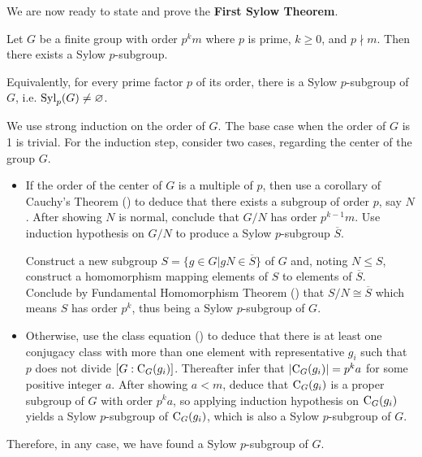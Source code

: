 We are now ready to state and prove the \textbf{First Sylow Theorem}.
\begin{theorem}[Sylow I]\label{thrm-sylow-1}
    Let $G$ be a finite group with order $p^k m$ where $p$ is prime, $k \geq 0$, and $p \nmid m$. Then there exists a Sylow $p$-subgroup.
\end{theorem}
\begin{remark}
    Equivalently, for every prime factor $p$ of its order, there is a Sylow $p$-subgroup of $G$, i.e. $\mathrm{Syl}_{p}(G) \neq \varnothing$.
\end{remark}
\begin{proofsketch}
    We use strong induction on the order of $G$. The base case when the order of $G$ is 1 is trivial. For the induction step, consider two cases, regarding the center of the group $G$.
    \begin{itemize}
        \item If the order of the center of $G$ is a multiple of $p$, then use a corollary of Cauchy's Theorem () to deduce that there exists a subgroup of order $p$, say $N$. After showing $N$ is normal, conclude that $G/N$ has order $p^{k-1}m$. Use induction hypothesis on $G/N$ to produce a Sylow $p$-subgroup $\overline{S}$.

        Construct a new subgroup $S = \{g \in G \vert gN \in \overline{S}\}$ of $G$ and, noting $N \leq S$, construct a homomorphism mapping elements of $S$ to elements of $\overline{S}$. Conclude by Fundamental Homomorphism Theorem () that $S/N \cong \overline{S}$ which means $S$ has order $p^k$, thus being a Sylow $p$-subgroup of $G$.

        \item Otherwise, use the class equation () to deduce that there is at least one conjugacy class with more than one element with representative $g_i$ such that $p$ does not divide $[G: \mathrm{C}_{G}(g_i)]$. Thereafter infer that $|\mathrm{C}_{G}(g_i)| = p^ka$ for some positive integer $a$. After showing $a < m$, deduce that $\mathrm{C}_{G}(g_i)$ is a proper subgroup of $G$ with order $p^ka$, so applying induction hypothesis on $\mathrm{C}_{G}(g_i)$ yields a Sylow $p$-subgroup of $\mathrm{C}_{G}(g_i)$, which is also a Sylow $p$-subgroup of $G$.
    \end{itemize}
    Therefore, in any case, we have found a Sylow $p$-subgroup of $G$.
\end{proofsketch}
